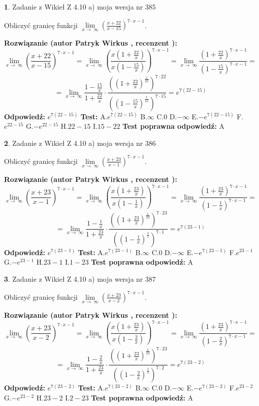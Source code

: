 \documentclass[12pt, a4paper]{article}
\theoremstyle{definition} %
\newtheorem{zad}{}
\newcommand{\zadStart}[1]{\begin{zad}#1\newline}
\newcommand{\zadStop}{\end{zad}}
\newcommand{\rozwStart}[2]{\noindent \textbf{Rozwiązanie (autor #1 , recenzent #2): }\newline}
\newcommand{\rozwStop}{\newline}
\newcommand{\odpStart}{\noindent \textbf{Odpowiedź:}\newline}
\newcommand{\odpStop}{\newline}
\newcommand{\testStart}{\noindent \textbf{Test:}\newline}
\newcommand{\testStop}{\newline}
\newcommand{\kluczStart}{\noindent \textbf{Test poprawna odpowiedź:}\newline}
\newcommand{\kluczStop}{\newline}
\begin{document}
\zadStart{Zadanie z Wikieł Z 4.10 a) moja wersja nr 385}


Obliczyć granicę funkcji  $\lim\limits_{x\to\ \infty}(\frac{x+22}{x-15})^{7\cdot x-1}$.
\zadStop
\rozwStart{Patryk Wirkus}{}
$$\lim\limits_{x\to\ \infty}(\frac{x+22}{x-15})^{7\cdot x-1} = \lim\limits_{x\to\ \infty}(\frac{x(1+\frac{22}{x})}{x(1-\frac{15}{x})})^{7\cdot x-1}=\lim\limits_{x\to\ \infty}\frac{(1+\frac{22}{x})^{7\cdot x-1}}{(1-\frac{15}{x})^{7\cdot x-1}}=$$
$$=\lim\limits_{x\to\ \infty}\frac{1-\frac{15}{x}}{1+\frac{22}{x}}\cdot\frac{((1+\frac{22}{x})^{\frac{x}{22}})^{7\cdot22}}{((1-\frac{15}{x})^{\frac{x}{15}})^{7\cdot15}}=e^{7(22-15)}$$
\rozwStop
\odpStart
$e^{7(22-15)}$
\odpStop
\testStart
A.$e^{7(22-15)}$ B.$\infty$ C.$0$ D.$-\infty$ E.$-e^{7(22-15)}$
F.$e^{22-15}$ G.$-e^{22-15}$
H.$22-15$
I.$15-22$
\testStop
\kluczStart
A
\kluczStop



\zadStart{Zadanie z Wikieł Z 4.10 a) moja wersja nr 386}


Obliczyć granicę funkcji  $\lim\limits_{x\to\ \infty}(\frac{x+23}{x-1})^{7\cdot x-1}$.
\zadStop
\rozwStart{Patryk Wirkus}{}
$$\lim\limits_{x\to\ \infty}(\frac{x+23}{x-1})^{7\cdot x-1} = \lim\limits_{x\to\ \infty}(\frac{x(1+\frac{23}{x})}{x(1-\frac{1}{x})})^{7\cdot x-1}=\lim\limits_{x\to\ \infty}\frac{(1+\frac{23}{x})^{7\cdot x-1}}{(1-\frac{1}{x})^{7\cdot x-1}}=$$
$$=\lim\limits_{x\to\ \infty}\frac{1-\frac{1}{x}}{1+\frac{23}{x}}\cdot\frac{((1+\frac{23}{x})^{\frac{x}{23}})^{7\cdot23}}{((1-\frac{1}{x})^{\frac{x}{1}})^{7\cdot1}}=e^{7(23-1)}$$
\rozwStop
\odpStart
$e^{7(23-1)}$
\odpStop
\testStart
A.$e^{7(23-1)}$ B.$\infty$ C.$0$ D.$-\infty$ E.$-e^{7(23-1)}$
F.$e^{23-1}$ G.$-e^{23-1}$
H.$23-1$
I.$1-23$
\testStop
\kluczStart
A
\kluczStop



\zadStart{Zadanie z Wikieł Z 4.10 a) moja wersja nr 387}


Obliczyć granicę funkcji  $\lim\limits_{x\to\ \infty}(\frac{x+23}{x-2})^{7\cdot x-1}$.
\zadStop
\rozwStart{Patryk Wirkus}{}
$$\lim\limits_{x\to\ \infty}(\frac{x+23}{x-2})^{7\cdot x-1} = \lim\limits_{x\to\ \infty}(\frac{x(1+\frac{23}{x})}{x(1-\frac{2}{x})})^{7\cdot x-1}=\lim\limits_{x\to\ \infty}\frac{(1+\frac{23}{x})^{7\cdot x-1}}{(1-\frac{2}{x})^{7\cdot x-1}}=$$
$$=\lim\limits_{x\to\ \infty}\frac{1-\frac{2}{x}}{1+\frac{23}{x}}\cdot\frac{((1+\frac{23}{x})^{\frac{x}{23}})^{7\cdot23}}{((1-\frac{2}{x})^{\frac{x}{2}})^{7\cdot2}}=e^{7(23-2)}$$
\rozwStop
\odpStart
$e^{7(23-2)}$
\odpStop
\testStart
A.$e^{7(23-2)}$ B.$\infty$ C.$0$ D.$-\infty$ E.$-e^{7(23-2)}$
F.$e^{23-2}$ G.$-e^{23-2}$
H.$23-2$
I.$2-23$
\testStop
\kluczStart
A
\kluczStop
\end{document}
